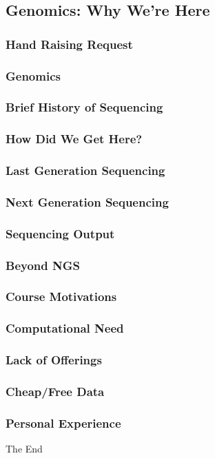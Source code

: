 \documentclass{beamer}
\begin{document}
\subsection{Genomics: Why We're Here}
\begin{frame}
\frametitle{Hand Raising Request}
%
\end{frame}
\begin{frame}
\frametitle{Genomics}
\end{frame}
\begin{frame}
\frametitle{Brief History of Sequencing}
%
\end{frame}
\begin{frame}
\frametitle{How Did We Get Here?}
\end{frame}
\begin{frame}
\frametitle{Last Generation Sequencing}
\end{frame}
\begin{frame}
\frametitle{Next Generation Sequencing}
\end{frame}
\begin{frame}
\frametitle{Sequencing Output}
\end{frame}
\begin{frame}
\frametitle{Beyond NGS}
\end{frame}
\begin{frame}
\frametitle{Course Motivations}
\end{frame}
\begin{frame}
\frametitle{Computational Need}
\end{frame}
\begin{frame}
\frametitle{Lack of Offerings}
\end{frame}
\begin{frame}
\frametitle{Cheap/Free Data}
\end{frame}
\begin{frame}
\frametitle{Personal Experience}
\end{frame}

\begin{frame}
\Huge{\centerline{The End}}
\end{frame}

\end{document}
